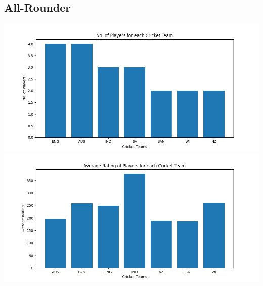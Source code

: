 \documentclass{article}
\begin{document}
\begin{normalsize}
            \subsection{All-Rounder}\label{subsec:all-rounder3}
                \includegraphics[scale=0.7]{test_all-rounder-1}
                \vspace{1em}\\
                \includegraphics[scale=0.7]{test_all-rounder-2}
\end{normalsize}
\end{document}

